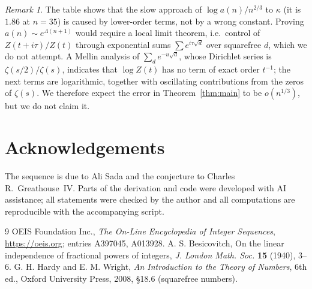 \documentclass[11pt,a4paper]{article}
\theoremstyle{remark}
\newtheorem{remark}[theorem]{Remark}
\begin{document}
\begin{remark}
The table shows that the slow approach of $\log a(n)/n^{2/3}$ to $\kappa$ (it is $1.86$ at $n=35$) is caused by lower-order terms, not by a wrong constant. Proving $a(n)\sim e^{\Lambda(n+1)}$ would require a local limit theorem, i.e.\ control of $Z(t+i\tau)/Z(t)$ through exponential sums $\sum e^{i\tau\sqrt d}$ over squarefree $d$, which we do not attempt. A Mellin analysis of $\sum_d e^{-u\sqrt d}$, whose Dirichlet series is $\zeta(s/2)/\zeta(s)$, indicates that $\log Z(t)$ has no term of exact order $t^{-1}$; the next terms are logarithmic, together with oscillating contributions from the zeros of $\zeta(s)$. We therefore expect the error in Theorem~\ref{thm:main} to be $o(n^{1/3})$, but we do not claim it.
\end{remark}

\section*{Acknowledgements}
The sequence is due to Ali Sada and the conjecture to Charles R.~Greathouse~IV. Parts of the derivation and code were developed with AI assistance; all statements were checked by the author and all computations are reproducible with the accompanying script.

\begin{thebibliography}{9}
 OEIS Foundation Inc., \emph{The On-Line Encyclopedia of Integer Sequences}, \url{https://oeis.org}; entries A397045, A013928.
 A. S. Besicovitch, On the linear independence of fractional powers of integers, \emph{J. London Math. Soc.} \textbf{15} (1940), 3--6.
 G. H. Hardy and E. M. Wright, \emph{An Introduction to the Theory of Numbers}, 6th ed., Oxford University Press, 2008, \S18.6 (squarefree numbers).
\end{thebibliography}
\end{document}
